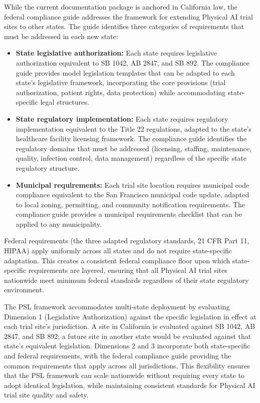 While the current documentation package is anchored in California law, the
federal compliance guide addresses the framework for extending Physical AI
trial sites to other states. The guide identifies three categories of
requirements that must be addressed in each new state:

\begin{itemize}
    \item \textbf{State legislative authorization:} Each state requires
    legislative authorization equivalent to SB 1042, AB 2847, and SB 892.
    The compliance guide provides model legislation templates that can be
    adapted to each state's legislative framework, incorporating the core
    provisions (trial authorization, patient rights, data protection) while
    accommodating state-specific legal structures.

    \item \textbf{State regulatory implementation:} Each state requires
    regulatory implementation equivalent to the Title 22 regulations,
    adapted to the state's healthcare facility licensing framework. The
    compliance guide identifies the regulatory domains that must be addressed
    (licensing, staffing, maintenance, quality, infection control, data
    management) regardless of the specific state regulatory structure.

    \item \textbf{Municipal requirements:} Each trial site location requires
    municipal code compliance equivalent to the San Francisco municipal code
    update, adapted to local zoning, permitting, and community notification
    requirements. The compliance guide provides a municipal requirements
    checklist that can be applied to any municipality.
\end{itemize}

Federal requirements (the three adapted regulatory standards, 21 CFR Part 11,
HIPAA) apply uniformly across all states and do not require state-specific
adaptation. This creates a consistent federal compliance floor upon which
state-specific requirements are layered, ensuring that all Physical AI trial
sites nationwide meet minimum federal standards regardless of their state
regulatory environment.

The PSL framework accommodates multi-state deployment by evaluating Dimension 1
(Legislative Authorization) against the specific legislation in effect at each
trial site's jurisdiction. A site in California is evaluated against SB 1042,
AB 2847, and SB 892; a future site in another state would be evaluated against
that state's equivalent legislation. Dimensions 2 and 3 incorporate both
state-specific and federal requirements, with the federal compliance guide
providing the common requirements that apply across all jurisdictions. This
flexibility ensures that the PSL framework can scale nationwide without
requiring every state to adopt identical legislation, while maintaining
consistent standards for Physical AI trial site quality and safety.

